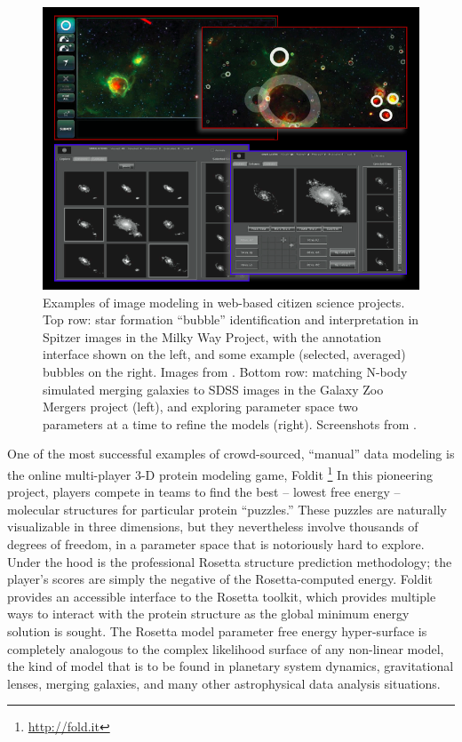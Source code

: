 \documentclass{ar2e}
\begin{document}
\begin{figure}[!ht]
\centering\includegraphics[width=\linewidth]{figs/modeling.png}
\caption{Examples of image modeling in web-based citizen science projects. Top
row: star formation ``bubble'' identification and interpretation in Spitzer
images in the Milky Way Project, with the annotation interface shown on the
left, and some example (selected, averaged) bubbles on the right. Images from
\citet{Simpson++2012MWP}. Bottom row: matching N-body simulated merging
galaxies to SDSS images in the Galaxy Zoo Mergers project (left), and
exploring parameter space two parameters at a time to refine the models
(right). Screenshots from \citet{HolincheckEtal2010}.}
\label{fig:modeling}
\end{figure}



One of the most successful examples of crowd-sourced, ``manual'' data modeling is the
online multi-player 3-D protein modeling game,  Foldit
\citep{Cooper++2010}\footnote{\url{http://fold.it}} In this pioneering
project, players compete in teams to find the best -- lowest free energy --
molecular structures for particular protein ``puzzles.'' 
These puzzles are naturally visualizable in three dimensions, but 
they nevertheless involve thousands of degrees of freedom, in a parameter
space that is notoriously hard to explore.
Under the hood is the
professional Rosetta structure prediction methodology; the player's scores are
simply the negative of the Rosetta-computed energy. Foldit provides an
accessible interface to the Rosetta toolkit, which provides multiple ways to
interact with the protein structure as the global minimum energy solution is
sought. The Rosetta model parameter free energy hyper-surface is completely analogous
to the complex likelihood surface of any non-linear model, the kind of model
that is to be found in planetary system dynamics, gravitational lenses,
merging galaxies, and many other astrophysical data analysis situations. 
\end{document}
